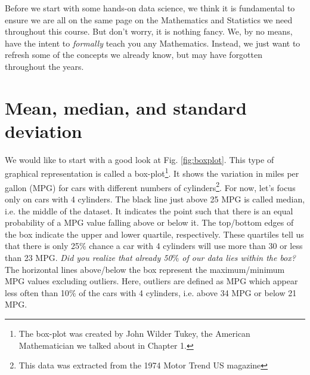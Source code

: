 Before we start with some hands-on data science, we think it is fundamental to ensure we are all on the same page on the Mathematics and Statistics we need throughout this course. But don't worry, it is nothing fancy. We, by no means, have the intent to \textit{formally} teach you any Mathematics. Instead, we just want to refresh some of the concepts we already know, but may have forgotten throughout the years.

\section{Mean, median, and standard deviation}

We would like to start with a good look at Fig. \ref{fig:boxplot}. This type of graphical representation is called a box-plot\footnote{The box-plot was created by John Wilder Tukey, the American Mathematician we talked about in Chapter 1.}. It shows the variation in miles per gallon (MPG) for cars with different numbers of cylinders\footnote{This data was extracted from the 1974 Motor Trend US magazine}. For now, let's focus only on cars with 4 cylinders. The black line just above 25 MPG is called median, i.e. the middle of the dataset. It indicates the point such that there is an equal probability of a MPG value falling above or below it. The top/bottom edges of the box indicate the upper and lower quartile, respectively. These quartiles tell us that there is only 25$\%$ chance a car with 4 cylinders will use more than 30 or less than 23 MPG. \textit{Did you realize that already 50$\%$ of our data lies within the box?} The horizontal lines above/below the box represent the maximum/minimum MPG values excluding outliers. Here, outliers are defined as MPG which appear less often than 10$\%$ of the cars with 4 cylinders, i.e. above 34 MPG or below 21 MPG.

